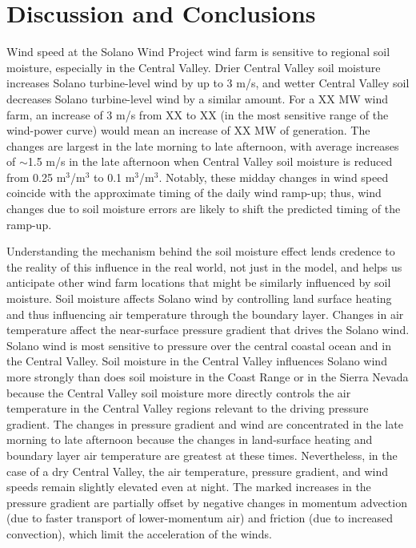 
\section{Discussion and Conclusions}

Wind speed at the Solano Wind Project wind farm is sensitive to regional soil moisture, especially in the Central Valley.  Drier Central Valley soil moisture increases Solano turbine-level wind by up to 3 m/s, and wetter Central Valley soil decreases Solano turbine-level wind by a similar amount.  For a XX MW wind farm, an increase of 3 m/s from XX to XX (in the most sensitive range of the wind-power curve) would mean an increase of XX MW of generation.  The changes are largest in the late morning to late afternoon, with average increases of $\sim$1.5 m/s in the late afternoon when Central Valley soil moisture is reduced from 0.25 m$^3$/m$^3$ to 0.1 m$^3$/m$^3$.  Notably, these midday changes in wind speed coincide with the approximate timing of the daily wind ramp-up; thus, wind changes due to soil moisture errors are likely to shift the predicted timing of the ramp-up.

Understanding the mechanism behind the soil moisture effect lends credence to the reality of this influence in the real world, not just in the model, and helps us anticipate other wind farm locations that might be similarly influenced by soil moisture.  Soil moisture affects Solano wind by controlling land surface heating and thus influencing air temperature through the boundary layer.  Changes in air temperature affect the near-surface pressure gradient that drives the Solano wind.  Solano wind is most sensitive to pressure over the central coastal ocean and in the Central Valley.  Soil moisture in the Central Valley influences Solano wind more strongly than does soil moisture in the Coast Range or in the Sierra Nevada because the Central Valley soil moisture more directly controls the air temperature in the Central Valley regions relevant to the driving pressure gradient.  The changes in pressure gradient and wind are concentrated in the late morning to late afternoon because the changes in land-surface heating and boundary layer air temperature are greatest at these times.  Nevertheless, in the case of a dry Central Valley, the air temperature, pressure gradient, and wind speeds remain slightly elevated even at night.  The marked increases in the pressure gradient are partially offset by negative changes in momentum advection (due to faster transport of lower-momentum air) and friction (due to increased convection), which limit the acceleration of the winds.

